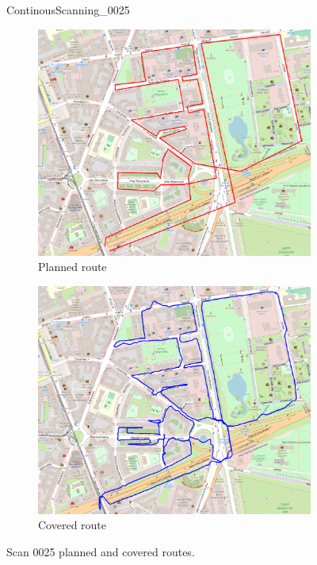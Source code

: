 \documentclass[a4paper,12pt]{book}
\begin{document}
\begin{enumerate}
\begin{figure}[H]
		\caption{ContinousScanning\_0025}
	\end{figure}
	\begin{figure}[H]
		\centering
		\begin{subfigure}{.84\textwidth}
			\centering
			\includegraphics[width=1\linewidth]{route_p25}
			\caption{Planned route}
			\label{fig:a25}
		\end{subfigure}%
		\linebreak
		\begin{subfigure}{.84\textwidth}
			\centering
			\includegraphics[width=1\linewidth]{route_c25}
			\caption{Covered route}
			\label{fig:b25}
		\end{subfigure}
		\caption{Scan 0025 planned and covered routes.}
		\label{fig:fig25}
	\end{figure}
\end{enumerate}
\end{document}
